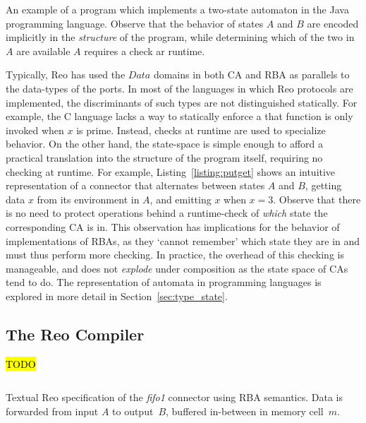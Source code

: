 \begin{listing}[ht]
	\inputminted[]{java}{putget.java}
	\caption[Type state automaton in Java.]{An example of a program which implements a two-state automaton in the Java programming language. Observe that the behavior of states $A$ and $B$ are encoded implicitly in the \textit{structure} of the program, while determining which of the two in $A$ are available $A$ requires a check ar runtime.}
	\label{listing:putget}
\end{listing}
Typically, Reo has used the $Data$ domains in both CA and RBA as parallels to the data-types of the ports. In most of the languages in which Reo protocols are implemented, the discriminants of such types are not distinguished statically. For example, the C language lacks a way to statically enforce a that function  is only invoked when $x$ is prime. Instead, checks at runtime are used to specialize behavior. On the other hand, the state-space is simple enough to afford a practical translation into the structure of the program itself, requiring no checking at runtime. For example, Listing~\ref{listing:putget} shows an intuitive representation of a connector that alternates between states $A$ and $B$, getting data $x$ from its environment in $A$, and emitting $x$ when $x=3$. Observe that there is no need to protect operations behind a runtime-check of \textit{which} state the corresponding CA is in. This observation has implications for the behavior of implementations of RBAs, as they `cannot remember' which state they are in and must thus perform more checking. In practice, the overhead of this checking is manageable, and does not \textit{explode} under composition as the state space of CAs tend to do. The representation of automata in programming languages is explored in more detail in Section~\ref{sec:type_state}.

\subsection{The Reo Compiler}


\hl{TODO}
%
%

\begin{listing}[ht]
	\inputminted[]{text}{fifo1.rba.treo}
	\caption[Fifo1 connector specfication in textual Reo language.]{Textual Reo specification of the \textit{fifo1} connector using RBA semantics. Data is forwarded from input $A$ to output~$B$, buffered in-between in memory cell~$m$.}
	\label{listing:fifo1_treo}
\end{listing}


